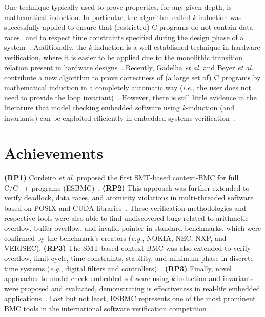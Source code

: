 \documentclass{acm_sen_article}
\begin{document}
One technique typically used to prove properties, for any given depth, is mathematical induction. In particular, the algorithm called \textit{k}-induction was successfully applied to ensure that (restricted) C programs do not contain data races~\cite{Donaldson10,Kinductor} and to respect time constraints specified during the design phase of a system~\cite{EenS03}. Additionally, the \textit{k}-induction is a well-established technique in hardware verification, where it is easier to be applied due to the monolithic transition relation present 
in hardware designs~\cite{EenS03,GrosseLD09,Sheera00}. Recently, Gadelha {\it et al.} and Beyer {\it et al.} contribute a new algorithm to prove correctness of (a large set of) C programs by mathematical induction in a completely automatic way ({\it i.e.}, the user does not need to provide the loop invariant)~\cite{Gadelha15,Beyer15}. However, there is still little evidence in the literature that model checking embedded software using \textit{k}-induction (and invariants) can be exploited efficiently in embedded systems verification~\cite{Rocha15}.


\section{Achievements}
\label{achievements}

\textbf{(RP1)} Cordeiro {\it et al.} proposed the first SMT-based context-BMC for full C/C++ programs (ESBMC)~\cite{Cordeiro12,ECBS13}. \textbf{(RP2)} This approach was further extended to verify deadlock, data races, and atomicity violations in multi-threaded software based on POSIX and CUDA libraries~\cite{CordeiroF11,Pereira15}. These verification methodologies and respective tools were also able to find undiscovered bugs related to arithmetic overflow, buffer overflow, and invalid pointer in standard benchmarks, which were confirmed by the benchmark’s creators ({\it e.g.}, NOKIA, NEC, NXP, and VERISEC). \textbf{(RP3)} The SMT-based context-BMC was also extended to verify overflow, limit cycle, time constraints, stability, and minimum phase in discrete-time systems ({\it e.g.}, digital filters and controllers)~\cite{esbmc_controller,dsv_spin2015,esbmc_filter}. \textbf{(RP3)} Finally, novel approaches to model check embedded software using \textit{k}-induction and invariants were proposed and evaluated, demonstrating is effectiveness in real-life embedded applications~\cite{Gadelha15,Rocha15}. Last but not least, ESBMC represents one of the most prominent BMC tools in the international software verification competition~\cite{MorseCNF13,MorseRCN014}.
\end{document}

